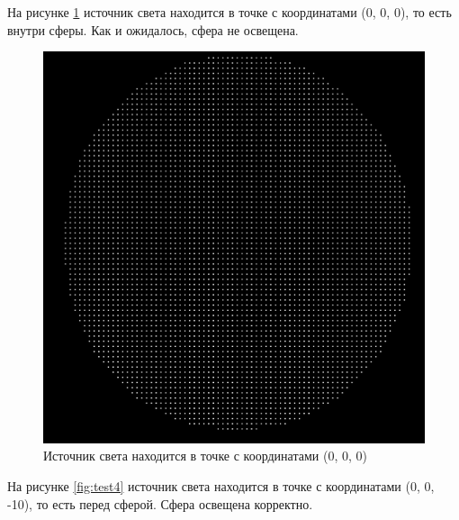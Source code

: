 На рисунке \ref{fig:test3} источник света находится в точке с координатами (0, 0, 0), то есть внутри сферы. Как и ожидалось, сфера не освещена.

\begin{figure}[H]
    \centering
    \includegraphics[scale=0.2]{images/test3.png}
    \caption{Источник света находится в точке с координатами (0, 0, 0)}
    \label{fig:test3}
\end{figure}

На рисунке \ref{fig:test4} источник света находится в точке с координатами (0, 0, -10), то есть перед сферой. Сфера освещена корректно.

